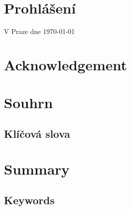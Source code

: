 

\pagestyle{empty}
\hypersetup{pageanchor=false}





\hypersetup{pageanchor=true}
\cleardoublepage
\vspace*{\fill}
\section*{Prohlášení}
\noindent
\Prohlaseni

\vspace{2cm}
\noindent
V Praze dne \today
\hspace*{\fill}\small{\AutorPrace}
\vspace{1cm}

\openright
\vspace*{\fill}
\section*{Acknowledgement}
\noindent
\Podekovani
\vspace{1cm}


\openright
\section*{Souhrn}
\noindent
\Abstrakt
\subsection*{Klíčová slova}
\noindent
\KlicovaSlova

\bigskip\bigskip\bigskip
\section*{Summary}
\noindent
\AbstraktEN
\subsection*{Keywords}
\noindent
\KlicovaSlovaEN

\openright
{}